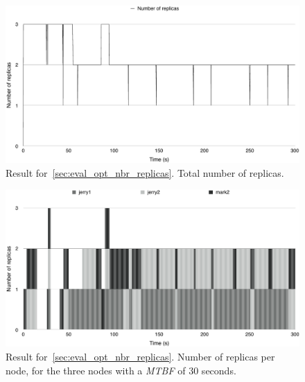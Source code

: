 \documentclass{cslthse-msc}
\begin{document}
\begin{figure}[!hbt]
\centering
\includegraphics[scale=0.5]{images/results/optimal_replicas/total.pdf}
\caption[Total number of replicas in~\cref{sec:eval_opt_nbr_replicas}]{Result for~\cref{sec:eval_opt_nbr_replicas}. Total number of replicas.} \label{fig:exp_opt_replicas_total}
\end{figure}

\begin{figure}[!hbt]
\centering
\includegraphics[scale=0.5]{images/results/optimal_replicas/MTBF_30.pdf}
\caption[Number of replicas in~\cref{sec:eval_opt_nbr_replicas} on nodes with \emph{MTBF} = 30 s]{Result for~\cref{sec:eval_opt_nbr_replicas}. Number of replicas per node, for the three nodes with a \emph{MTBF} of 30 seconds.} \label{fig:exp_opt_replicas_MTBF_30}
\end{figure}
\end{document}
